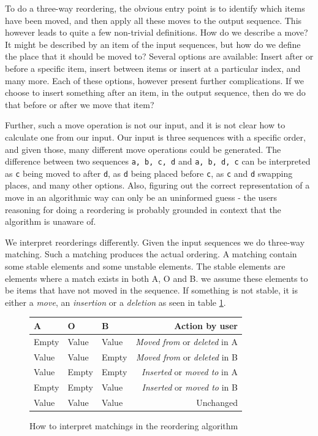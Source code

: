 \documentclass[11pt]{article}
\begin{document}
To do a three-way reordering, the obvious entry point is to identify which items have been moved, and then apply all these moves to the output sequence. This however leads to quite a few non-trivial definitions. How do we describe a move? It might be described by an item of the input sequences, but how do we define the place that it should be moved to? Several options are available: Insert after or before a specific item, insert between items or insert at a particular index, and many more. Each of these options, however present further complications. If we choose to insert something after an item, in the output sequence, then do we do that before or after we move that item?

Further, such a move operation is not our input, and it is not clear how to calculate one from our input. Our input is three sequences with a specific order, and given those, many different move operations could be generated. The difference between two sequences \texttt{a, b, c, d} and \texttt{a, b, d, c} can be interpreted as \texttt{c} being moved to after \texttt{d}, as \texttt{d} being placed before \texttt{c}, as \texttt{c} and \texttt{d} swapping places, and many other options. Also, figuring out the correct representation of a move in an algorithmic way can only be an uninformed guess - the users reasoning for doing a reordering is probably grounded in context that the algorithm is unaware of.

We interpret reorderings differently. Given the input sequences we do three-way matching. Such a matching produces the actual ordering. A matching contain some stable elements and some unstable elements. The stable elements are elements where a match exists in both A, O and B. we assume these elements to be items that have not moved in the sequence. If something is not stable, it is either a \textit{move}, an \textit{insertion} or a \textit{deletion} as seen in table \ref{ReorderingTable}.

\begin{figure}
\centering
\begin{tabular}{ | l | l | l || r |}
  \hline                        
   \textbf{A} & \textbf{O} & \textbf{B} & \textbf{Action by user} \\
  \hline                        
  Empty & Value & Value & \textit{Moved from} or \textit{deleted} in A \\
  Value & Value & Empty & \textit{Moved from} or \textit{deleted} in B \\
  Value & Empty & Empty & \textit{Inserted} or \textit{moved to} in A \\
  Empty & Empty & Value & \textit{Inserted} or \textit{moved to} in B \\
  Value & Value & Value & Unchanged \\
  \hline  
\end{tabular}
  \caption{How to interpret matchings in the reordering algorithm}
\label{ReorderingTable}
\end{figure}
\end{document}
